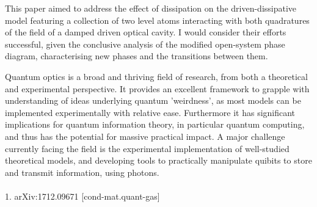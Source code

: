 This paper aimed to address the effect of dissipation on the driven-dissipative model featuring a collection of two level atoms interacting with both quadratures of the field of a damped driven optical cavity. I would consider their efforts successful, given the conclusive analysis of the modified open-system phase diagram, characterising new phases and the transitions between them.

Quantum optics is a broad and thriving field of research, from both a theoretical and experimental perspective. It provides an excellent framework to grapple with understanding of ideas underlying quantum 'weirdness', as most models can be implemented experimentally with relative ease. Furthermore it has significant implications for quantum information theory, in particular quantum computing, and thus has the potential for massive practical impact. A major challenge currently facing the field is the experimental implementation of well-studied theoretical models, and developing tools to practically manipulate quibits to store and transmit information, using photons. 
\\
\\1. 	arXiv:1712.09671 [cond-mat.quant-gas]


